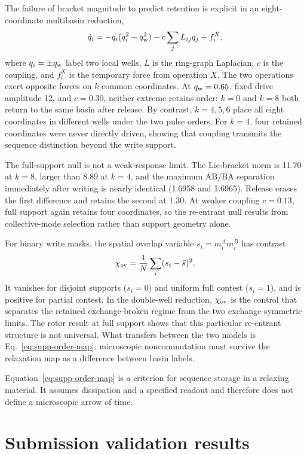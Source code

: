 \documentclass[aps,prl,onecolumn,superscriptaddress,nofootinbib]{revtex4-2}
\begin{document}
The failure of bracket magnitude to predict retention is explicit in an
eight-coordinate multibasin reduction,
\begin{equation}
 \dot q_i=-q_i(q_i^2-q_{\rm w}^2)
 -c\sum_j L_{ij}q_j+f_i^X ,
 \label{eq:supp-double-well-order}
\end{equation}
where \(q_i=\pm q_{\rm w}\) label two local wells, \(L\) is the ring-graph
Laplacian, \(c\) is the coupling, and \(f_i^X\) is the temporary force from
operation \(X\).  The two operations exert opposite forces on \(k\) common
coordinates.  At \(q_{\rm w}=0.65\), fixed drive amplitude 12, and
\(c=0.30\), neither extreme retains order: \(k=0\) and \(k=8\) both return to
the same basin after release.  By contrast, \(k=4,5,6\) place all eight
coordinates in different wells under the two pulse orders.  For \(k=4\),
four retained coordinates were never directly driven, showing that coupling
transmits the sequence distinction beyond the write support.

The full-support null is not a weak-response limit.  The Lie-bracket norm is
11.70 at \(k=8\), larger than 8.89 at \(k=4\), and the maximum AB/BA
separation immediately after writing is nearly identical
(1.6958 and 1.6965).  Release erases the first difference and retains the
second at 1.30.  At weaker coupling \(c=0.13\), full support again retains
four coordinates, so the re-entrant null results from collective-mode
selection rather than support geometry alone.

For binary write masks, the spatial overlap variable
\(s_i=m_i^Am_i^B\) has contrast
\begin{equation}
 \chi_{\rm ov}=\frac{1}{N}\sum_i(s_i-\bar s)^2 .
\end{equation}
It vanishes for disjoint supports (\(s_i=0\)) and uniform full contest
(\(s_i=1\)), and is positive for partial contest.  In the double-well
reduction, \(\chi_{\rm ov}\) is the control that separates the retained
exchange-broken regime from the two exchange-symmetric limits.  The rotor
result at full support shows that this particular re-entrant structure is not
universal.  What transfers between the two models is
Eq.~\eqref{eq:supp-order-map}: microscopic noncommutation must survive the
relaxation map as a difference between basin labels.

Equation~\eqref{eq:supp-order-map} is a criterion for sequence storage in a
relaxing material.  It assumes dissipation and a specified readout and
therefore does not define a microscopic arrow of time.

\section{Submission validation results}
\end{document}
